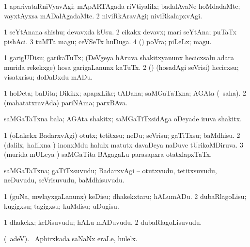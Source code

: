 \bentry
{}
\gl{\kirxvi}
\bmng
\bnum
\num{1} aparivataRniVyavAgi; mApARTAgada riVtiyalilx; badalAvaNe hoMdadaMte; vayxtAyxsa mADalAgadaMte. 
\num{2} niviRkAravAgi; niviRkalapxvAgi. 
\enum
\emng
\eentry

\bentry
{}
\gl{\nA}
\bmng
\bnum
\num{1} seYtAnana shishu; devavxda kUsu. 
\num{2} cikakx devavx; mari seYtAna; puTaTx pishAci. 
\num{3} tuMTa magu; ceVSeTx huDuga. 
\num{4} (\pArxparx) poVra; piLeLx; magu. 
\enum
\emng
\eentry

\bentry
{}
\gl{\sakirx}
\bmng
\bnum
\num{1} garigUDisu; garikaTuTx; (DeVgeya hAruva shakitxyanunx hecicxsalu adara murida rekekxge) hosa garigaLanunx kaTuTx. 
\num{2} (\pArxparx) (hosadAgi seVrisi) hecicxsu; visatxrisu; doDaDxdu mADu. 
\enum
\emng
\eentry

\bentry
{}
\gl{\nA}
\bmng
\bnum
\num{1} hoDeta; baDita; Dikikx; apapxLike; tADana; saMGaTaTxna; AGAta (\rUpa\ saha). 
\num{2} (mahatatxravAda) pariNAma; parxBAva. 
\enum
\emng

\noindent
\gl{\pagu}
\bmng
{} saMGaTaTxna bala; AGAta shakitx; saMGaTiTxsidAga oDeyade iruva shakitx. 
\emng
\eentry

\bentry
{}
\gl{\sakirx}
\bmng
\bnum
\num{1} (oLakekx BadarxvAgi) otutx; tetitxsu; neDu; seVrisu; gaTiTxsu; baMdhisu. 
\num{2} (\BUkaq dalilx, halilxna \vi) inonxMdu halulx matutx davaDeya naDuve tUrikoMDiruva. 
\num{3} (murida mULeya \vi) saMGaTita BAgagaLu parasapxra otatxlapxTaTx. 
\enum
\emng
\eentry

\bentry
{}
\gl{\nA}
\bmng
saMGaTaTxna; gaTiTxsuvudu; BadarxvAgi -- otutxvudu, tetitxsuvudu, neDuvudu, seVrisuvudu, baMdhisuvudu. 
\emng
\eentry

\bentry
{}
\gl{\sakirx}
\bmng
\bnum
\num{1} (guNa, mwlayxgaLanunx) keDisu; dhakekxtaru; hALumADu. 
\num{2} dubaRlagoLisu; kugigxsu; tagigxsu; kuMdisu; uDugisu. 
\enum
\emng
\eentry

\bentry
{}
\gl{\nA}
\bmng
\bnum
\num{1} dhakekx; keDisuvudu; hALu mADuvudu. 
\num{2} dubaRlagoLisuvudu. 
\enum
\emng
\eentry

\bentry
{}
\gl{\nA}
\bmng
(\bava\ adeV). \da\ Aphirxkada saNaNx eraLe, hulelx.   
\emng
\eentry

